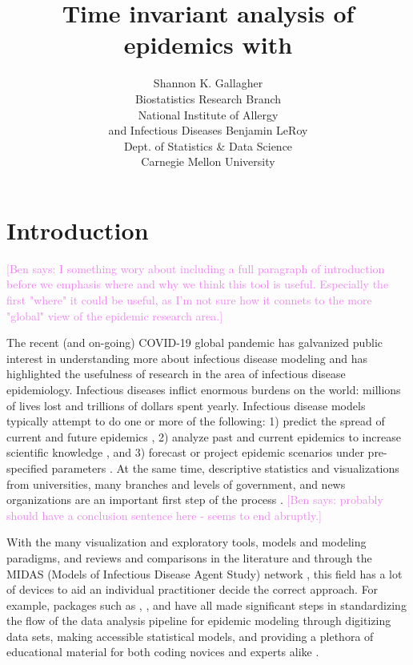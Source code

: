 \documentclass[
  shortnames]{jss}
\author{
Shannon K. Gallagher\\Biostatistics Research Branch\\
National Institute of Allergy\\
and Infectious Diseases \And Benjamin LeRoy\\Dept. of Statistics \& Data
Science\\
Carnegie Mellon University
}
\title{Time invariant analysis of epidemics with \pkg{EpiCompare}}
\begin{document}
\newcommand{\shannon}[1]{\textcolor{orange}{#1}}
\newcommand{\ben}[1]{\textcolor{violet}{#1}}

\newtheorem{theorem}{Theorem}

\section[Intro]{Introduction}\label{sec:intro}

\textcolor{violet}{[Ben says: I something wory about including a full paragraph of introduction before we emphasis where and why we think this tool is useful. Especially the first "where" it could be useful, as I'm not sure how it connets to the more "global" view of the epidemic research area.]}

The recent (and on-going) COVID-19 global pandemic has galvanized public
interest in understanding more about infectious disease modeling and has
highlighted the usefulness of research in the area of infectious disease
epidemiology. Infectious diseases inflict enormous burdens on the world:
millions of lives lost and trillions of dollars spent yearly. Infectious
disease models typically attempt to do one or more of the following: 1)
predict the spread of current and future epidemics
\citep[e.g. flu prediction][]{Biggerstaff2016}, 2) analyze past and
current epidemics to increase scientific knowledge
\citep[e.g. historical measle outbreaks][]{Neal2004}, and 3) forecast or
project epidemic scenarios under pre-specified parameters
\citep[e.g.][]{ferguson2020}. At the same time, descriptive statistics
and visualizations from universities, many branches and levels of
government, and news organizations are an important first step of the
process \citep{dong2020,cdc-covid-tracker2021,wp-covid-tracker2021}.
\textcolor{violet}{[Ben says: probably should have a conclusion sentence here - seems to end abruptly.]}

With the many visualization and exploratory tools, models and modeling
paradigms, and reviews and comparisons in the literature and through the
MIDAS (Models of Infectious Disease Agent Study) network
\citep{midasnetwork2021}, this field has a lot of devices to aid an
individual practitioner decide the correct approach. For example,
 packages such as , , and
 have all made significant steps in standardizing the flow of
the data analysis pipeline for epidemic modeling through digitizing data
sets, making accessible statistical models, and providing a plethora of
educational material for both coding novices and experts alike
\citep{surveillance2017,Jenness2018,King2016}.
\end{document}
